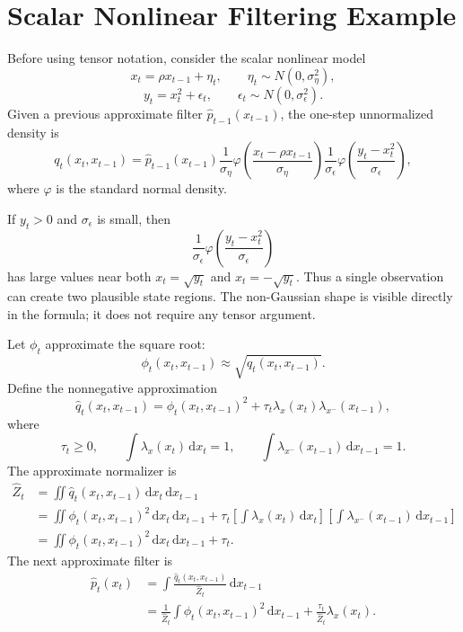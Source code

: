 \documentclass[11pt]{article}
\newcommand{\dd}{\mathrm{d}}
\renewcommand{\[}{\begin{equation}}
\renewcommand{\]}{\end{equation}}
\theoremstyle{definition}
\theoremstyle{remark}
\begin{document}
\section{Scalar Nonlinear Filtering Example}

Before using tensor notation, consider the scalar nonlinear model
\[
  x_t=\rho x_{t-1}+\eta_t,\qquad
  \eta_t\sim N(0,\sigma_\eta^2),
\]
\[
  y_t=x_t^2+\epsilon_t,\qquad
  \epsilon_t\sim N(0,\sigma_\epsilon^2).
  \label{eq:p14-scalar-model}
\]
Given a previous approximate filter \(\widehat p_{t-1}(x_{t-1})\), the
one-step unnormalized density is
\[
  q_t(x_t,x_{t-1})
  =
  \widehat p_{t-1}(x_{t-1})
  \frac{1}{\sigma_\eta}
  \varphi\!\left(\frac{x_t-\rho x_{t-1}}{\sigma_\eta}\right)
  \frac{1}{\sigma_\epsilon}
  \varphi\!\left(\frac{y_t-x_t^2}{\sigma_\epsilon}\right),
  \label{eq:p14-scalar-q}
\]
where \(\varphi\) is the standard normal density.

If \(y_t>0\) and \(\sigma_\epsilon\) is small, then
\[
  \frac{1}{\sigma_\epsilon}
  \varphi\!\left(\frac{y_t-x_t^2}{\sigma_\epsilon}\right)
\]
has large values near both \(x_t=\sqrt{y_t}\) and
\(x_t=-\sqrt{y_t}\).  Thus a single observation can create two plausible
state regions.  The non-Gaussian shape is visible directly in the formula; it
does not require any tensor argument.

Let \(\phi_t\) approximate the square root:
\[
  \phi_t(x_t,x_{t-1})\approx \sqrt{q_t(x_t,x_{t-1})}.
  \label{eq:p14-scalar-root}
\]
Define the nonnegative approximation
\[
  \widehat q_t(x_t,x_{t-1})
  =
  \phi_t(x_t,x_{t-1})^2
  +
  \tau_t\lambda_x(x_t)\lambda_{x^-}(x_{t-1}),
  \label{eq:p14-scalar-qhat}
\]
where
\[
  \tau_t\ge0,\qquad
  \int\lambda_x(x_t)\,\dd x_t=1,\qquad
  \int\lambda_{x^-}(x_{t-1})\,\dd x_{t-1}=1.
\]
The approximate normalizer is
\[
\begin{aligned}
  \widehat Z_t
  &=
  \iint \widehat q_t(x_t,x_{t-1})
  \,\dd x_t\,\dd x_{t-1}  \\
  &=
  \iint \phi_t(x_t,x_{t-1})^2\,\dd x_t\,\dd x_{t-1}
  +
  \tau_t
  \left[\int\lambda_x(x_t)\,\dd x_t\right]
  \left[\int\lambda_{x^-}(x_{t-1})\,\dd x_{t-1}\right] \\
  &=
  \iint \phi_t(x_t,x_{t-1})^2\,\dd x_t\,\dd x_{t-1}
  +\tau_t.
\end{aligned}
  \label{eq:p14-scalar-Zhat}
\]
The next approximate filter is
\[
\begin{aligned}
  \widehat p_t(x_t)
  &=
  \int
  \frac{\widehat q_t(x_t,x_{t-1})}{\widehat Z_t}
  \,\dd x_{t-1} \\
  &=
  \frac{1}{\widehat Z_t}
  \int\phi_t(x_t,x_{t-1})^2\,\dd x_{t-1}
  +
  \frac{\tau_t}{\widehat Z_t}\lambda_x(x_t).
\end{aligned}
  \label{eq:p14-scalar-next-filter}
\]
\end{document}
